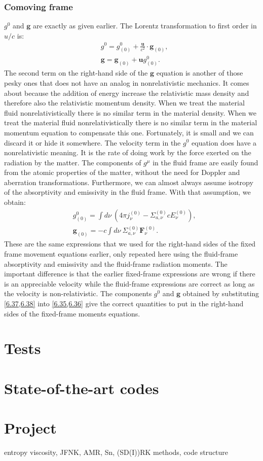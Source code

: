 \documentclass[letterpaper]{report}
\newcommand\bs{\boldsymbol}
\renewcommand{\(}{\left(}
\renewcommand{\)}{\right)}
\renewcommand{\[}{\left[}
\renewcommand{\]}{\right]}
\begin{document}
\subsection{Comoving frame}
$g^0$ and $\bs{g}$ are exactly as given earlier. The Lorentz transformation to
first order in $u/c$ is:
\begin{align}
  &g^0 = g_{(0)}^0 + \frac{\bs{u}}{c^2}\cdot \bs{g}_{(0)}, \label{6.35}\\
  &\bs{g} = \bs{g}_{(0)} + \bs{u} g_{(0)}^0. \label{6.36}
\end{align}
The second term on the right-hand side of the $\bs{g}$ equation is another of
those pesky ones that does not have an analog in nonrelativistic mechanics. It
comes about because the addition of energy increase the relativistic mass
density and therefore also the relativistic momentum density. When we treat
the material fluid nonrelativistically there is no similar term in the
material density. When we treat the material fluid nonrelativistically there
is no similar term in the material momentum equation to compensate this one.
Fortunately, it is small and we can discard it or hide it somewhere. The
velocity term in the $g^0$ equation does have a nonrelativistic meaning. It is
the rate of doing work by the force exerted on the radiation by the matter.
The components of $g^{\mu}$ in the fluid frame are easily found from the
atomic properties of the matter, without the need for Doppler and aberration
transformations. Furthermore, we can almost always assume isotropy of the
absorptivity and emissivity in the fluid frame. With that assumption, we
obtain:
\begin{align}
  &g_{(0)}^0 = \int d\nu\ \(4\pi
  j_{\nu}^{(0)}-\Sigma_{a,\nu}^{(0)}cE_{\nu}^{(0)}\), \label{6.37}\\
  &\bs{g}_{(0)} = -c \int d\nu\ \Sigma_{a,\nu}^{(0)}\bs{F}_{\nu}^{(0)}.
  \label{6.38} 
\end{align}
These are the same expressions that we used for the right-hand sides of the
fixed frame movement equations earlier, only repeated here using the
fluid-frame absorptivity and emissivity and the fluid-frame radiation moments.
The important difference is that the earlier fixed-frame expressions are wrong
if there is an appreciable velocity while the fluid-frame expressions are
correct as long as the velocity is non-relativistic. The components $g^0$ and
$\bs{g}$ obtained by substituting \cref{6.37,6.38} into \cref{6.35,6.36} give
the correct quantities to put in the right-hand sides of the fixed-frame
moments equations.

\chapter{Tests}

\chapter{State-of-the-art codes}

\chapter{Project}
entropy viscosity, JFNK, AMR, Sn, (SD(I))RK methods, code structure
\end{document}
